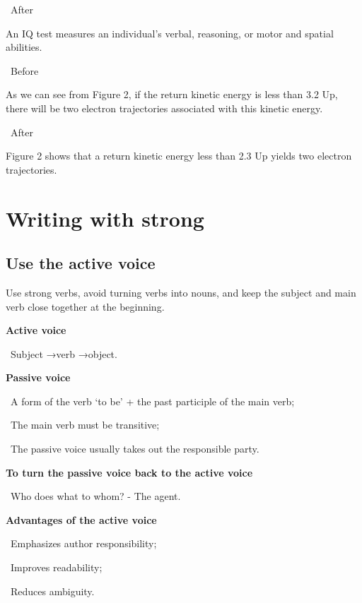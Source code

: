 \documentclass[a4paper, 12pt]{article}
\begin{document}
\par\textbullet\ After
\par An IQ test measures an individual's verbal, reasoning, or motor and spatial abilities.

\par\textbullet\ Before
\par As we can see from Figure 2, if the return kinetic energy is less than 3.2 Up, there will be two electron trajectories associated with this kinetic energy.

\par\textbullet\ After
\par Figure 2 shows that a return kinetic energy less than 2.3 Up yields two electron trajectories.

\newpage\section{Writing with strong}

\subsection{Use the active voice}

Use strong verbs, avoid turning verbs into nouns, and keep the subject and main verb close together at the beginning.

\par\textbf{Active voice}
\par\textbullet\ Subject \quad→\quad verb \quad→\quad object.

\par\textbf{Passive voice}
\par\textbullet\ A form of the verb `to be' + the past participle of the main verb;
\par\textbullet\ The main verb must be transitive;
\par\textbullet\ The passive voice usually takes out the responsible party.

\par\textbf{To turn the passive voice back to the active voice}
\par\textbullet\ Who does what to whom? - The agent.

\par\textbf{Advantages of the active voice}
\par\textbullet\ Emphasizes author responsibility;
\par\textbullet\ Improves readability;
\par\textbullet\ Reduces ambiguity.
\end{document}
